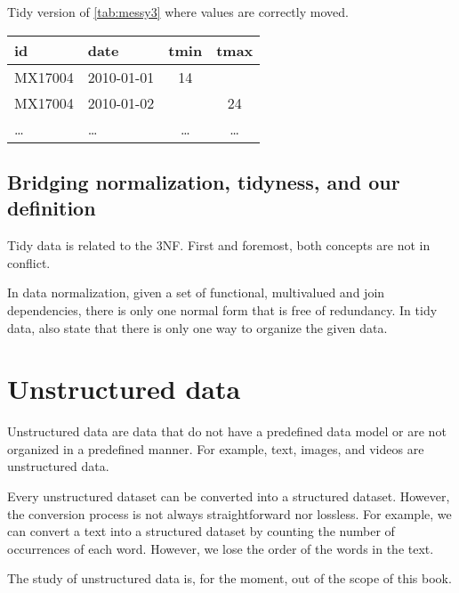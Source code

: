\begin{tablebox}[label=tab:tidy3b]{Tidy version of \cref{tab:messy3} where values are correctly moved.}
  \centering
  \begin{tabular}{llcc}
    \toprule
    id & date & tmin & tmax \\
    \midrule
    MX17004 & 2010-01-01 & 14 &    \\
    MX17004 & 2010-01-02 &    & 24 \\
    \dots & \dots & \dots & \dots \\
    \bottomrule
  \end{tabular}
\end{tablebox}

\subsection{Bridging normalization, tidyness, and our definition}

Tidy data is related to the 3NF.  First and foremost, both concepts are not in conflict.

In data normalization, given a set of functional, multivalued and join dependencies, there
is only one normal form that is free of redundancy.  In tidy data,
\citeauthor{Wickham2023} also state that there is only one way to organize the given data.


\section{Unstructured data}

Unstructured data are data that do not have a predefined data model or are not organized
in a predefined manner.  For example, text, images, and videos are unstructured data.

Every unstructured dataset can be converted into a structured dataset.  However, the
conversion process is not always straightforward nor lossless.  For example, we can
convert a text into a structured dataset by counting the number of occurrences of each
word.  However, we lose the order of the words in the text.

The study of unstructured data is, for the moment, out of the scope of this book.
